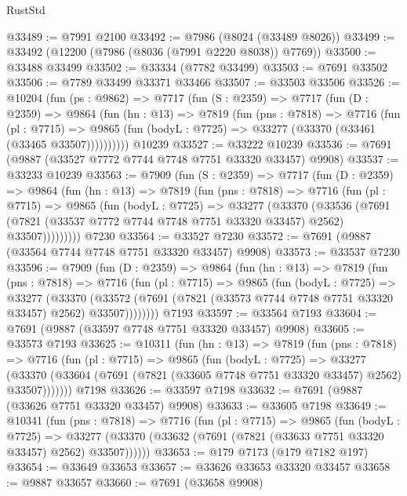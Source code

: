 \begin{lexlean}{RustStd}
\begin{coremodule}
@33489 := @7991 @2100
@33492 := @7986 (@8024 (@33489 @8026))
@33499 := @33492 (@12200 (@7986 (@8036 (@7991 @2220 @8038)) @7769))
@33500 := @33488 @33499
@33502 := @33334 (@7782 @33499)
@33503 := @7691 @33502
@33506 := @7789 @33499 @33371 @33466
@33507 := @33503 @33506
@33526 := @10204
    (fun (ps : @9862) =>
    @7717
      (fun (S : @2359) =>
      @7717
        (fun (D : @2359) =>
        @9864
          (fun (hn : @13) =>
          @7819
            (fun (pns : @7818) =>
            @7716
              (fun (pl : @7715) =>
              @9865 (fun (bodyL : @7725) => @33277 (@33370 (@33461 (@33465 @33507))))))))))
    @10239
@33527 := @33222 @10239
@33536 := @7691 (@9887 (@33527 @7772 @7744 @7748 @7751 @33320 @33457) @9908)
@33537 := @33233 @10239
@33563 := @7909
    (fun (S : @2359) =>
    @7717
      (fun (D : @2359) =>
      @9864
        (fun (hn : @13) =>
        @7819
          (fun (pns : @7818) =>
          @7716
            (fun (pl : @7715) =>
            @9865
              (fun (bodyL : @7725) =>
              @33277
                (@33370
                  (@33536
                    (@7691
                      (@7821 (@33537 @7772 @7744 @7748 @7751 @33320 @33457) @2562)
                      @33507)))))))))
    @7230
@33564 := @33527 @7230
@33572 := @7691 (@9887 (@33564 @7744 @7748 @7751 @33320 @33457) @9908)
@33573 := @33537 @7230
@33596 := @7909
    (fun (D : @2359) =>
    @9864
      (fun (hn : @13) =>
      @7819
        (fun (pns : @7818) =>
        @7716
          (fun (pl : @7715) =>
          @9865
            (fun (bodyL : @7725) =>
            @33277
              (@33370
                (@33572 (@7691 (@7821 (@33573 @7744 @7748 @7751 @33320 @33457) @2562) @33507))))))))
    @7193
@33597 := @33564 @7193
@33604 := @7691 (@9887 (@33597 @7748 @7751 @33320 @33457) @9908)
@33605 := @33573 @7193
@33625 := @10311
    (fun (hn : @13) =>
    @7819
      (fun (pns : @7818) =>
      @7716
        (fun (pl : @7715) =>
        @9865
          (fun (bodyL : @7725) =>
          @33277
            (@33370 (@33604 (@7691 (@7821 (@33605 @7748 @7751 @33320 @33457) @2562) @33507)))))))
    @7198
@33626 := @33597 @7198
@33632 := @7691 (@9887 (@33626 @7751 @33320 @33457) @9908)
@33633 := @33605 @7198
@33649 := @10341
    (fun (pns : @7818) =>
    @7716
      (fun (pl : @7715) =>
      @9865
        (fun (bodyL : @7725) =>
        @33277 (@33370 (@33632 (@7691 (@7821 (@33633 @7751 @33320 @33457) @2562) @33507))))))
@33653 := @179 @7173 (@179 @7182 @197)
@33654 := @33649 @33653
@33657 := @33626 @33653 @33320 @33457
@33658 := @9887 @33657
@33660 := @7691 (@33658 @9908)

\end{coremodule}
\end{lexlean}
